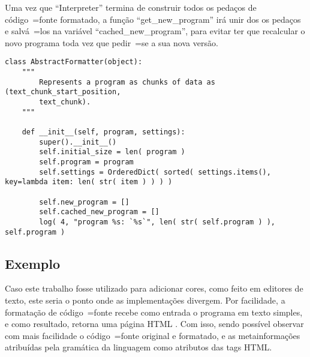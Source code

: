 Uma vez que ``Interpreter'' termina de construir todos os pedaços de código~=fonte formatado,
a função ``get\_new\_program'' irá unir dos os pedaços e
salvá~=los na variável ``cached\_new\_program'',
para evitar ter que recalcular o novo programa toda vez que pedir~=se a sua nova versão.
\begin{lstlisting}[caption={Construtor de ``AbstractFormatter''},label={construtorDeParsedProgram},style=python_style]
class AbstractFormatter(object):
    """
        Represents a program as chunks of data as (text_chunk_start_position,
        text_chunk).
    """

    def __init__(self, program, settings):
        super().__init__()
        self.initial_size = len( program )
        self.program = program
        self.settings = OrderedDict( sorted( settings.items(), key=lambda item: len( str( item ) ) ) )

        self.new_program = []
        self.cached_new_program = []
        log( 4, "program %s: `%s`", len( str( self.program ) ), self.program )
\end{lstlisting}


\subsection{Exemplo}

Caso este trabalho fosse utilizado para adicionar cores,
como feito em editores de texto,
este seria o ponto onde as implementações divergem.
Por facilidade,
a formatação de código~=fonte recebe como entrada o programa em texto simples,
e como resultado,
retorna uma página HTML \cite{parallelParserForHTML}.
Com isso,
sendo possível observar com mais facilidade o código~=fonte original e
formatado,
e as metainformações atribuídas pela gramática da linguagem como atributos das tags HTML.

